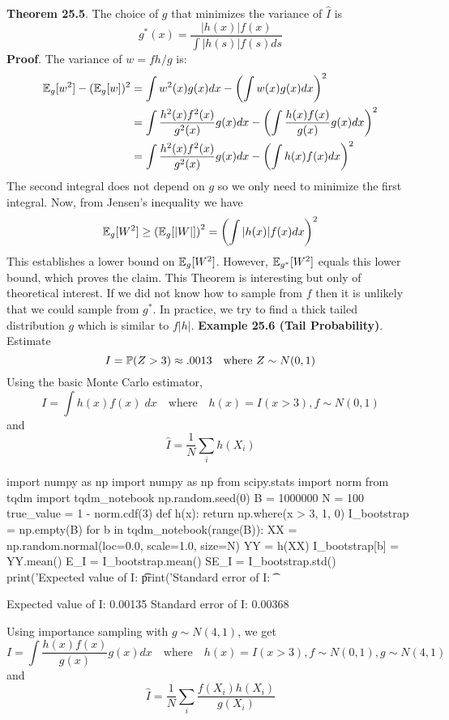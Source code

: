 \textbf{Theorem 25.5}. The choice of \(g\) that minimizes the variance
of \(\hat{I}\) is
\[
g^{*}(x) = \frac{|h(x)| f(x) }{\int | h(s) | f(s)  ds}
\]
\textbf{Proof}. The variance of \(w = f h / g\) is:
\begin{align*}
\EXP_g[w^{2}] - (\EXP_g[w])^{2} &= \int w^{2}(x) g(x) dx - \left( \int w(x) g(x) dx \right)^{2} \\
&= \int \frac{h^{2}(x) f^{2}(x)}{g^{2}(x)} g(x) dx - \left( \int \frac{h(x) f(x)}{g(x)} g(x) dx \right)^{2} \\
&= \int \frac{h^{2}(x) f^{2}(x)}{g^{2}(x)} g(x) dx - \left( \int h(x) f(x) dx \right)^{2}
\end{align*}
The second integral does not depend on \(g\) so we only need to minimize
the first integral. Now, from Jensen's inequality we have
\[
\EXP_g[W^{2}] \geq \left(\EXP_g[|W|]\right)^{2} = \left( \int |h(x)| f(x) dx \right)^{2}
\]
This establishes a lower bound on \(\operatorname{\mathbb{E}}_g[W^{2}]\). However,
\(\operatorname{\mathbb{E}}_{g^{*}}[W^{2}]\) equals this lower bound, which proves the
claim.
This Theorem is interesting but only of theoretical interest. If we did
not know how to sample from \(f\) then it is unlikely that we could
sample from \(g^{*}\). In practice, we try to find a thick tailed
distribution \(g\) which is similar to \(f |h|\).
\textbf{Example 25.6 (Tail Probability)}. Estimate
\[
I = \operatorname{\mathbb{P}}(Z > 3) \approx .0013
\quad \text{where } Z \sim N(0, 1)
\]
Using the basic Monte Carlo estimator,
\[
I = \int h(x) f(x) \; dx \quad \text{where} \quad h(x) = I(x > 3), f \sim N(0, 1)
\]
and \[
\hat{I} = \frac{1}{N} \sum_{i} h(X_{i})
\]

\begin{python}
import numpy as np
import numpy as np
from scipy.stats import norm
from tqdm import tqdm_notebook
np.random.seed(0)
B = 1000000
N = 100
true_value = 1 - norm.cdf(3)
def h(x):
    return np.where(x > 3, 1, 0)
I_bootstrap = np.empty(B)
for b in tqdm_notebook(range(B)):
    XX = np.random.normal(loc=0.0, scale=1.0, size=N)
    YY = h(XX)
    I_bootstrap[b] = YY.mean()
E_I = I_bootstrap.mean()
SE_I = I_bootstrap.std()
print('Expected value of I: \t %
print('Standard error of I: \t %
\end{python}
\begin{console}
Expected value of I:     0.00135
Standard error of I:     0.00368
    \end{console}
Using importance sampling with \(g \sim N(4, 1)\), we get
\[
I = \int \frac{h(x) f(x)}{g(x)} g(x) dx
\quad \text{where} \quad h(x) = I(x > 3), f \sim N(0, 1), g \sim N(4, 1)
\]
and
\[
\hat{I} = \frac{1}{N} \sum_{i} \frac{f(X_{i}) h(X_{i})}{g(X_{i})}
\]

